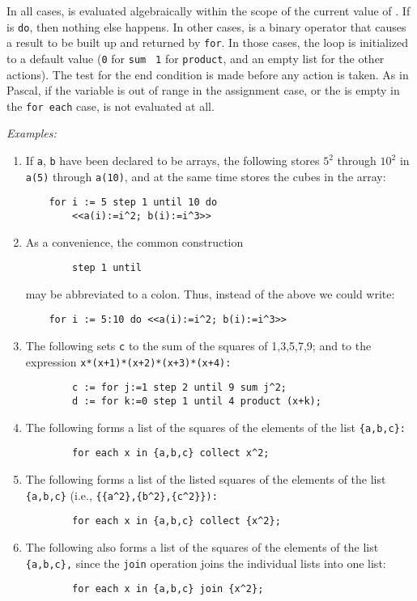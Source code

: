 In all cases,  is evaluated algebraically within the
scope of the current value of .  If  is
\texttt{do}, then nothing else happens.  In other cases, 
is a binary operator that causes a result to be built up and
returned by \texttt{for}.  In those cases, the loop is
initialized to a default value (\texttt{0} for \texttt{sum} {\tt
1} for \texttt{product}, and an empty list for the other
actions).  The test for the end condition is made before any action is
taken.  As in Pascal, if the variable is out of range in the assignment
case, or the  is empty in the \texttt{for each}
case,  is not evaluated at all.

\textit{Examples:}
\begin{enumerate}
\item If \texttt{a}, \texttt{b} have been declared to be arrays, the following
stores $5^{2}$ through $10^{2}$ in \texttt{a(5)} through \texttt{a(10)}, and at
the same time stores the cubes in the  array:
\begin{verbatim}
    for i := 5 step 1 until 10 do
        <<a(i):=i^2; b(i):=i^3>>
\end{verbatim}
\item As a convenience, the common construction
\begin{verbatim}
        step 1 until
\end{verbatim}
may be abbreviated to a colon. Thus, instead of the above we could write:
\begin{verbatim}
    for i := 5:10 do <<a(i):=i^2; b(i):=i^3>>
\end{verbatim}
\item The following sets \texttt{c} to the sum of the squares of 1,3,5,7,9;
and  to the expression \texttt{x*(x+1)*(x+2)*(x+3)*(x+4):}
\begin{verbatim}
        c := for j:=1 step 2 until 9 sum j^2;
        d := for k:=0 step 1 until 4 product (x+k);
\end{verbatim}
\item The following forms a list of the squares of the elements of the list
\texttt{\{a,b,c\}:}
\begin{verbatim}
        for each x in {a,b,c} collect x^2;
\end{verbatim}
\item The following forms a list of the listed squares of the elements of the
list \texttt{\{a,b,c\}}
(i.e., \texttt{\{\{a\textasciicircum 2\},\{b\textasciicircum 2\},\{c\textasciicircum 2\}\}):}
\begin{verbatim}
        for each x in {a,b,c} collect {x^2};
\end{verbatim}
\item The following also forms a list of the squares of the elements of
the list \texttt{\{a,b,c\},} since the \texttt{join} operation joins the
individual lists into one list:
\begin{verbatim}
        for each x in {a,b,c} join {x^2};
\end{verbatim}
\end{enumerate}
